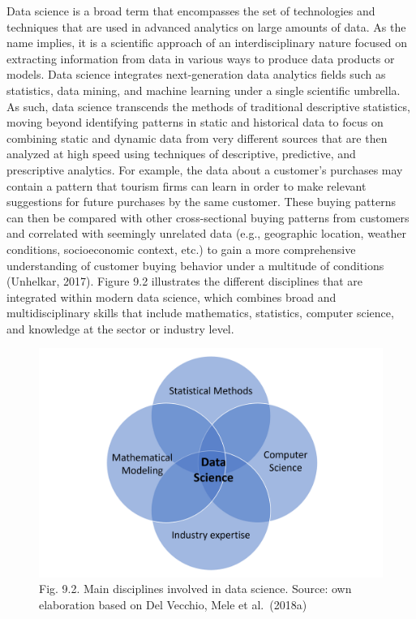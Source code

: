 \documentclass[
  letterpaper,
  DIV=11,
  numbers=noendperiod]{scrreprt}
\begin{document}
Data science is a broad term that encompasses the set of technologies
and techniques that are used in advanced analytics on large amounts of
data. As the name implies, it is a scientific approach of an
interdisciplinary nature focused on extracting information from data in
various ways to produce data products or models. Data science integrates
next-generation data analytics fields such as statistics, data mining,
and machine learning under a single scientific umbrella. As such, data
science transcends the methods of traditional descriptive statistics,
moving beyond identifying patterns in static and historical data to
focus on combining static and dynamic data from very different sources
that are then analyzed at high speed using techniques of descriptive,
predictive, and prescriptive analytics. For example, the data about a
customer's purchases may contain a pattern that tourism firms can learn
in order to make relevant suggestions for future purchases by the same
customer. These buying patterns can then be compared with other
cross-sectional buying patterns from customers and correlated with
seemingly unrelated data (e.g., geographic location, weather conditions,
socioeconomic context, etc.) to gain a more comprehensive understanding
of customer buying behavior under a multitude of conditions (Unhelkar,
2017). Figure 9.2 illustrates the different disciplines that are
integrated within modern data science, which combines broad and
multidisciplinary skills that include mathematics, statistics, computer
science, and knowledge at the sector or industry level.

\begin{figure}

{\centering \includegraphics{img/fig10.png}

}

\caption{Fig. 9.2. Main disciplines involved in data science. Source:
own elaboration based on Del Vecchio, Mele et al.~(2018a)}

\end{figure}
\end{document}
